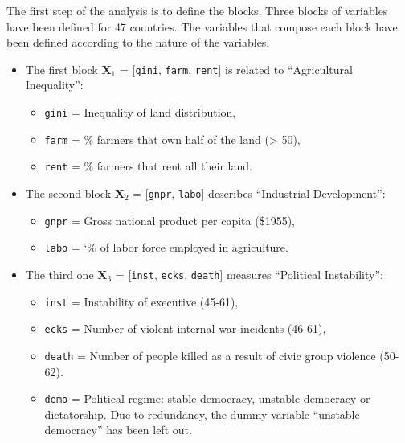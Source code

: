 \documentclass[
]{jss}
\providecommand{\tightlist}{%
  \setlength{\itemsep}{0pt}\setlength{\parskip}{0pt}}
\begin{document}
\normalsize

The first step of the analysis is to define the blocks. Three blocks of
variables have been defined for 47 countries. The variables that compose
each block have been defined according to the nature of the variables.

\begin{itemize}
\tightlist
\item
  The first block \(\mathbf{X}_1\) = {[}\texttt{gini}, \texttt{farm},
  \texttt{rent}{]} is related to ``Agricultural Inequality'':

  \begin{itemize}
  \tightlist
  \item
    \texttt{gini} = Inequality of land distribution,
  \item
    \texttt{farm} = \% farmers that own half of the land (\textgreater{}
    50),
  \item
    \texttt{rent} = \% farmers that rent all their land.
  \end{itemize}
\item
  The second block \(\mathbf{X}_2\) = {[}\texttt{gnpr}, \texttt{labo}{]}
  describes ``Industrial Development'':

  \begin{itemize}
  \tightlist
  \item
    \texttt{gnpr} = Gross national product per capita (\$1955),
  \item
    \texttt{labo} = `\% of labor force employed in agriculture.
  \end{itemize}
\item
  The third one \(\mathbf{X}_3\) = {[}\texttt{inst}, \texttt{ecks},
  \texttt{death}{]} measures ``Political Instability'':

  \begin{itemize}
  \tightlist
  \item
    \texttt{inst} = Instability of executive (45-61),
  \item
    \texttt{ecks} = Number of violent internal war incidents (46-61),
  \item
    \texttt{death} = Number of people killed as a result of civic group
    violence (50-62).
  \item
    \texttt{demo} = Political regime: stable democracy, unstable
    democracy or dictatorship. Due to redundancy, the dummy variable
    ``unstable democracy'' has been left out.
  \end{itemize}
\end{itemize}
\end{document}
